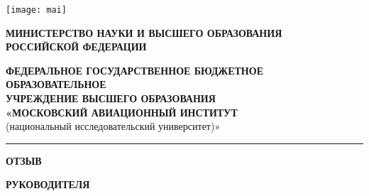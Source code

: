 \thispagestyle{empty}
\noindent
\begin{minipage}{0.2\textwidth}
    \texttt{[image: mai]}
\end{minipage}
\hfill
\begin{minipage}{0.8\textwidth}
    \centering
    \footnotesize
    \textbf{\footnotesize
    МИНИСТЕРСТВО НАУКИ И ВЫСШЕГО ОБРАЗОВАНИЯ\\
    РОССИЙСКОЙ ФЕДЕРАЦИИ}

    \vspace{1em}
    \textbf{\footnotesize
    ФЕДЕРАЛЬНОЕ ГОСУДАРСТВЕННОЕ БЮДЖЕТНОЕ ОБРАЗОВАТЕЛЬНОЕ\\ 
    УЧРЕЖДЕНИЕ ВЫСШЕГО ОБРАЗОВАНИЯ\\ 
    «МОСКОВСКИЙ АВИАЦИОННЫЙ ИНСТИТУТ}\\ 
    (национальный исследовательский университет)»
\end{minipage}

\noindent\rule{\textwidth}{1.5pt}

\vspace{-2em}
\noindent
\begin{center}
    \noindent\textbf{ОТЗЫВ}

    \vspace{-0.8em}
    \noindent\textbf{РУКОВОДИТЕЛЯ}
\end{center}

